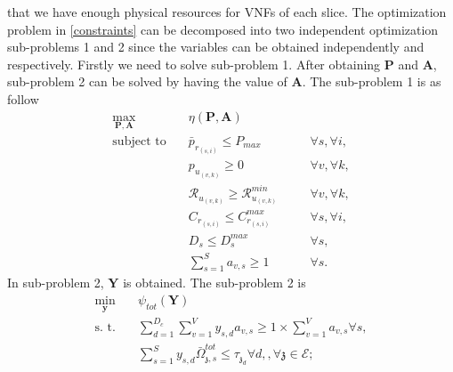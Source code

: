 \documentclass[conference]{IEEEtran}
\begin{document}
that we have enough physical resources for VNFs of each slice.\newline
The optimization problem in \eqref{constraints} can be decomposed into two independent optimization sub-problems 1 and 2 since the variables can be obtained independently and respectively. Firstly we need to solve sub-problem 1. After obtaining $\boldsymbol{P}$ and $ \boldsymbol{A}$, sub-problem 2 can be solved by having the value of $ \boldsymbol{A}$. 
The sub-problem 1 is as follow
\begin{subequations}
\begin{alignat}{4}
\max\limits_{\boldsymbol{P}, \boldsymbol{A} }   \quad &   \eta(\boldsymbol{P},\boldsymbol{A})\\
\text{subject to} \quad  & \bar{p}_{r_{(s,i)}} \leq P_{max} && \quad \forall s, \forall i,   \\
&p_{u_{(v,k)}}  \geq 0  &&\quad \forall v, \forall k, \\
&\mathcal{R}_{u_{(v,k)}} \geq  \mathcal{R}_{u_{(v,k)}}^{min} && \quad \forall v, \forall k, \\
&C_{r_{(s,i)}} \leq C_{r_{(s,i)}}^{max}  &&\quad \forall s, \forall i,\label{cc14} \\
&D_{s} \leq D_{s}^{max}  &&\quad \forall s, \label{cc15} \\
& \textstyle  \sum_{s=1}^{S}a_{v,s} \geq 1 &&\quad \forall s.
\end{alignat}
\label{constraints1}
\end{subequations}
In sub-problem 2, $ \boldsymbol{Y}$ is obtained. The sub-problem 2 is
\begin{subequations}
\begin{alignat}{4}
\min\limits_{\boldsymbol{y} }   \quad &   \psi_{tot}(\boldsymbol{Y})\\
\text{s. t.} \quad & \textstyle \sum_{d=1}^{D_c}\sum_{v=1}^{V}y_{s,d}a_{v,s} \geq 1\times\sum_{v=1}^{V}a_{v,s} \forall s, \\
 &\textstyle  \sum_{s=1}^{S} y_{s,d} \bar{\Omega}_{\mathfrak{z},s}^{tot}  \leq   \tau_{\mathfrak{z}_d}  \forall d,, \forall \mathfrak{z}\in \mathcal{E};  \label{eqomega}
\end{alignat}
\label{constraints2}
\end{subequations}
\end{document}
